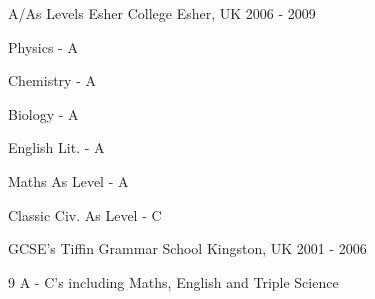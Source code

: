 \begin{cventries}
  \cventry
    {A/As Levels}
    {Esher College}
    {Esher, UK}
    {2006 - 2009}
    { 
    \begin{cvitems}
    \setlength\multicolsep{0pt}
      \begin{multicols}{3}
      \item{Physics - A}
      \item{Chemistry - A}
      \item{Biology - A}
      \item{English Lit. - A}
      \item{Maths As Level - A}
      \item{Classic Civ. As Level - C}
      \end{multicols}
      \end{cvitems}
    }
    
  \cventry
    {GCSE's}
    {Tiffin Grammar School}
    {Kingston, UK}
    {2001 - 2006}
    {
    \begin{cvitems}
      \item{9 A - C's including Maths, English and Triple Science}
      \end{cvitems}
    }
\end{cventries}
